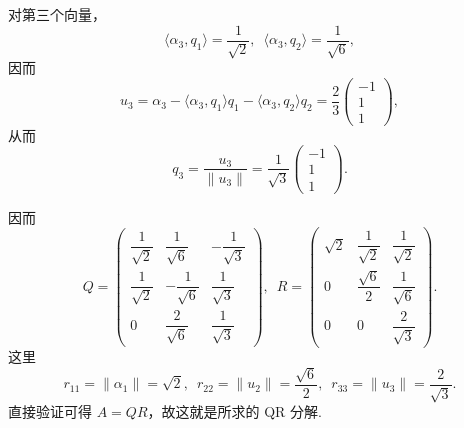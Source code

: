 \documentclass[12pt,fontset=fandol]{ctexart}
\begin{document}
\begin{solve}
    对第三个向量，
    \[
        \langle \alpha_3, q_1 \rangle = \frac{1}{\sqrt{2}}, \enspace
        \langle \alpha_3, q_2 \rangle = \frac{1}{\sqrt{6}},
    \]
    因而
    \[
        u_3 = \alpha_3 - \langle \alpha_3, q_1 \rangle q_1 - \langle \alpha_3, q_2 \rangle q_2
        = \frac{2}{3}
        \begin{pmatrix}
            -1 \\
            1 \\
            1
        \end{pmatrix},
    \]
    从而
    \[
        q_3 = \frac{u_3}{\lVert u_3 \rVert}
        = \frac{1}{\sqrt{3}}
        \begin{pmatrix}
            -1 \\
            1 \\
            1
        \end{pmatrix}.
    \]

    因而
    \[
        Q = \begin{pmatrix}
            \dfrac{1}{\sqrt{2}} & \dfrac{1}{\sqrt{6}}  & -\dfrac{1}{\sqrt{3}} \\
            \dfrac{1}{\sqrt{2}} & -\dfrac{1}{\sqrt{6}} & \dfrac{1}{\sqrt{3}}  \\
            0                   & \dfrac{2}{\sqrt{6}}  & \dfrac{1}{\sqrt{3}}
        \end{pmatrix}, \enspace
        R = \begin{pmatrix}
            \sqrt{2} & \dfrac{1}{\sqrt{2}} & \dfrac{1}{\sqrt{2}} \\
            0        & \dfrac{\sqrt{6}}{2} & \dfrac{1}{\sqrt{6}} \\
            0        & 0                   & \dfrac{2}{\sqrt{3}}
        \end{pmatrix}.
    \]
    这里
    \[
        r_{11} = \lVert \alpha_1 \rVert = \sqrt{2}, \enspace
        r_{22} = \lVert u_2 \rVert = \frac{\sqrt{6}}{2}, \enspace
        r_{33} = \lVert u_3 \rVert = \frac{2}{\sqrt{3}}.
    \]
    直接验证可得 $A = QR$，故这就是所求的 QR 分解.
\end{solve}
\end{document}
